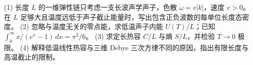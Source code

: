 (1) 长度 \(L\) 的一维弹性链只考虑一支长波声学声子，色散 \(\omega=v|k|\)，速度 \(v>0\)。在 \(L\) 足够大且温度远低于声子截止能量时，写出包含正负波数的每单位长度态密度。
(2) 忽略与温度无关的零点能，求低温声子内能 \(U(T)/L\)；已知 \(\int_0^\infty x/(e^x-1)\,dx=\pi^2/6\)。
(3) 求定长热容 \(C/L\) 与熵 \(S/L\)，并检验 \(T\to0\) 极限。
(4) 解释低温线性热容与三维 Debye 三次方律不同的原因，指出有限长度与高温截止的限制。
